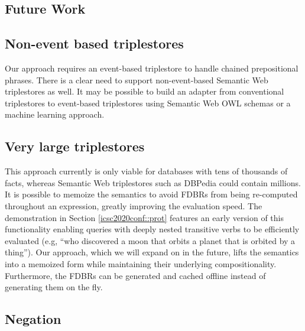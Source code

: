 \documentclass[../main.tex]{subfiles}
\begin{document}
\begin{refsection}



\section{Future Work}

\subsection{Non-event based triplestores}

Our approach requires an event-based triplestore to handle chained prepositional phrases. There is a clear need to support non-event-based Semantic Web triplestores as well. It may be possible to build an adapter from conventional triplestores to event-based triplestores using Semantic Web OWL schemas or a machine learning approach.

\subsection{Very large triplestores}

This approach currently is only viable for databases with tens of thousands of facts, whereas Semantic Web triplestores such as DBPedia \cite{dbpedia} could contain millions.  It is possible to memoize the semantics to avoid FDBRs from being re-computed throughout an expression, greatly improving the evaluation speed.  The demonstration in Section \ref{icsc2020conf::prot} features an early version of this functionality enabling queries with deeply nested transitive verbs to be efficiently evaluated (e.g, ``who discovered a moon that orbits a planet that is orbited by a thing'').  Our approach, which we will expand on in the future, lifts the semantics into a memoized form while maintaining their underlying compositionality.  Furthermore, the FDBRs can be generated and cached offline instead of generating them on the fly.

\subsection{Negation}


\end{refsection}
\end{document}
